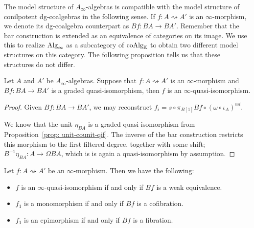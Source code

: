 \documentclass[../thesis.tex]{subfiles}
\begin{document}
        The model structure of $A_\infty$-algebras is compatible with the model structure of conilpotent dg-coalgebras in the following sense. If $f: A \rightsquigarrow A'$ is an $\infty$-morphism, we denote its dg-coalgebra counterpart as $Bf: BA \rightarrow BA'$. Remember that the bar construction is extended as an equivalence of categories on its image. We use this to realize $\tt{Alg}_\infty$ as a subcategory of $\tt{coAlg}_\mathbb{K}$ to obtain two different model structures on this category. The following proposition tells us that these structures do not differ.

        \begin{lemma}\label{lem: qif-infty-qi}
            Let $A$ and $A'$ be $A_\infty$-algebras. Suppose that $f: A \rightsquigarrow A'$ is an $\infty$-morphism and $Bf: BA \rightarrow BA'$ is a graded quasi-isomorphism, then $f$ is an $\infty$-quasi-isomorphism. 
        \end{lemma}

        \begin{proof}
            Given $Bf : BA \rightarrow BA'$, we may reconstruct $f_i = s \circ \pi_{B[1]} Bf \circ (\omega \circ \iota_A)^{\otimes i}$.

            We know that the unit $\eta_{BA}$ is a graded quasi-isomorphism from Proposition~\ref{prop: unit-counit-qif}. The inverse of the bar construction restricts this morphism to the first filtered degree, together with some shift; $B^{-1}\eta_{BA}: A \rightarrow \Omega BA$, which is is again a quasi-isomorphism by assumption.
        \end{proof}

        \begin{proposition}\label{prop: coherent-model-structure}
            Let $f : A \rightsquigarrow A'$ be an $\infty$-morphism. Then we have the following:
            \begin{itemize}
                \item $f$ is an $\infty$-quasi-isomorphism if and only if $Bf$ is a weak equivalence.
                \item $f_1$ is a monomorphism if and only if $Bf$ is a cofibration.
                \item $f_1$ is an epimorphism if and only if $Bf$ is a fibration.
            \end{itemize}
        \end{proposition}
\end{document}
